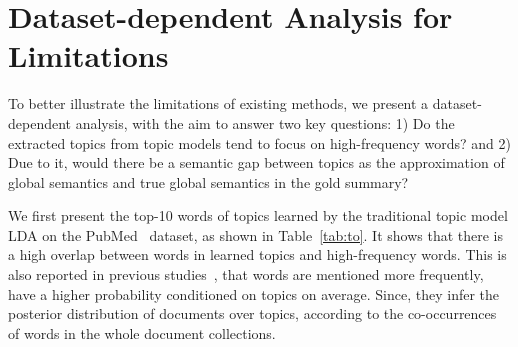 \documentclass[11pt]{article}
\begin{document}
\section{Dataset-dependent Analysis for Limitations}
\label{sec:ana}
To better illustrate the limitations of existing methods, we present a dataset-dependent analysis, with the aim to answer two key questions:
1) Do the extracted topics from topic models tend to focus on high-frequency words? and
2) Due to it, would there be a semantic gap between topics as the approximation of global semantics and true global semantics in the gold summary?

We first present the top-10 words of topics learned by the traditional topic model LDA on the PubMed~\cite{cohan2018discourse} dataset, as shown in Table~\ref{tab:to}.
It shows that there is a high overlap between words in learned topics and high-frequency words.
This is also reported in previous studies~\cite{griffiths2002probabilistic, steyvers2007probabilistic, chi2019topic}, that words are mentioned more frequently, have a higher probability conditioned on topics on average.
Since, they infer the posterior distribution of documents over topics, according to the co-occurrences of words in the whole document collections.
\begin{table}[!hbt]
    \centering
    \scriptsize
\caption{top-10 words of topics learned by LDA on Pubmed dataset.}
    \label{tab:to}


\end{table}
\end{document}
